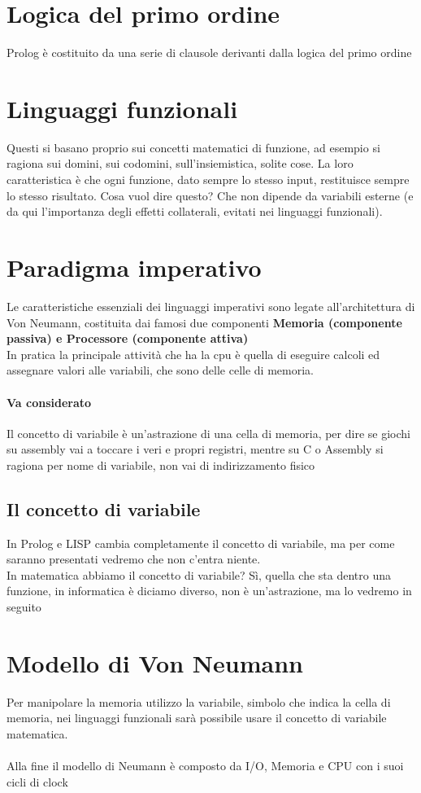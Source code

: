 \documentclass[12pt, a4paper, openany, oneside]{book}
\begin{document}
{\section{Logica del primo ordine}
Prolog è costituito da una serie di clausole derivanti dalla logica del primo
ordine
\section{Linguaggi funzionali}
Questi si basano proprio sui concetti matematici di funzione, ad esempio si 
ragiona sui domini, sui codomini, sull'insiemistica, solite cose. La loro caratteristica
è che ogni funzione, dato sempre lo stesso input, restituisce sempre lo stesso
risultato. Cosa vuol dire questo? Che non dipende da variabili esterne (e da qui
l'importanza degli effetti collaterali, evitati nei linguaggi funzionali).
\section{Paradigma imperativo}
Le caratteristiche essenziali dei linguaggi imperativi sono legate all'architettura 
di Von Neumann, costituita dai famosi due componenti 
\textbf{Memoria (componente passiva) e Processore (componente attiva)}
\\
In pratica la principale attività che ha la cpu è quella di eseguire calcoli
ed assegnare valori alle variabili, che sono delle celle di memoria.
\paragraph{Va considerato}
Il concetto di variabile è un'astrazione di una cella di memoria, per dire 
se giochi su assembly vai a toccare i veri e propri registri, mentre su C o 
Assembly si ragiona per nome di variabile, non vai di indirizzamento fisico
\subsection{Il concetto di variabile}
In Prolog e LISP cambia completamente il concetto di variabile, ma per come 
saranno presentati vedremo che non c'entra niente. \\
In matematica abbiamo il concetto di variabile? Sì, quella che sta dentro una
funzione, in informatica è diciamo diverso, non è un'astrazione, ma lo vedremo
in seguito
\section{Modello di Von Neumann}
Per manipolare la memoria utilizzo la variabile, simbolo che indica la cella 
di memoria, nei linguaggi funzionali sarà possibile usare il concetto di 
variabile matematica. 
\\ \\
Alla fine il modello di Neumann è composto da I/O, Memoria e CPU con i suoi 
cicli di clock
}
\end{document}
